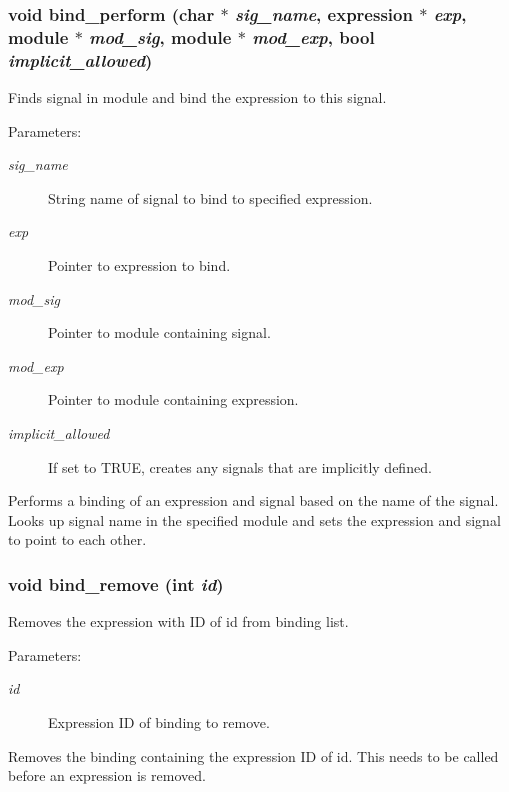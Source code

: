 \subsubsection{\setlength{\rightskip}{0pt plus 5cm}void bind\_\-perform (char $\ast$ {\em sig\_\-name}, {\bf expression} $\ast$ {\em exp}, {\bf module} $\ast$ {\em mod\_\-sig}, {\bf module} $\ast$ {\em mod\_\-exp}, {\bf bool} {\em implicit\_\-allowed})}\label{binding_8h_a2}


Finds signal in module and bind the expression to this signal.

\begin{Desc}
\item[Parameters: ]\par
\begin{description}
\item[{\em 
sig\_\-name}]String name of signal to bind to specified expression. \item[{\em 
exp}]Pointer to expression to bind. \item[{\em 
mod\_\-sig}]Pointer to module containing signal. \item[{\em 
mod\_\-exp}]Pointer to module containing expression. \item[{\em 
implicit\_\-allowed}]If set to TRUE, creates any signals that are implicitly defined.\end{description}
\end{Desc}
Performs a binding of an expression and signal based on the name of the signal. Looks up signal name in the specified module and sets the expression and signal to point to each other. 
\subsubsection{\setlength{\rightskip}{0pt plus 5cm}void bind\_\-remove (int {\em id})}\label{binding_8h_a1}


Removes the expression with ID of id from binding list.

\begin{Desc}
\item[Parameters: ]\par
\begin{description}
\item[{\em 
id}]Expression ID of binding to remove.\end{description}
\end{Desc}
Removes the binding containing the expression ID of id. This needs to be called before an expression is removed. 